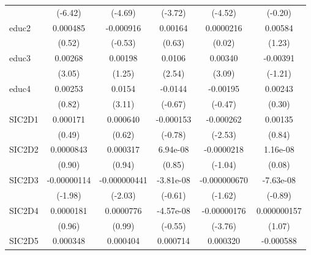 \begin{table}[htbp]
\begin{tabular}{l*{5}{c}}
            &     (-6.42)         &     (-4.69)         &     (-3.72)         &     (-4.52)         &     (-0.20)         \\
educ2       &    0.000485         &   -0.000916         &     0.00164         &   0.0000216         &     0.00584         \\
            &      (0.52)         &     (-0.53)         &      (0.63)         &      (0.02)         &      (1.23)         \\
educ3       &     0.00268\sym{**} &     0.00198         &      0.0106\sym{*}  &     0.00340\sym{**} &    -0.00391         \\
            &      (3.05)         &      (1.25)         &      (2.54)         &      (3.09)         &     (-1.21)         \\
educ4       &     0.00253         &      0.0154\sym{**} &     -0.0144         &    -0.00195         &     0.00243         \\
            &      (0.82)         &      (3.11)         &     (-0.67)         &     (-0.47)         &      (0.30)         \\
SIC2D1      &    0.000171         &    0.000640         &   -0.000153         &   -0.000262\sym{*}  &     0.00135         \\
            &      (0.49)         &      (0.62)         &     (-0.78)         &     (-2.53)         &      (0.84)         \\
SIC2D2      &   0.0000843         &    0.000317         &    6.94e-08         &  -0.0000218         &    1.16e-08         \\
            &      (0.90)         &      (0.94)         &      (0.85)         &     (-1.04)         &      (0.08)         \\
SIC2D3      & -0.00000114\sym{*}  &-0.000000441\sym{*}  &   -3.81e-08         &-0.000000670         &   -7.63e-08         \\
            &     (-1.98)         &     (-2.03)         &     (-0.61)         &     (-1.62)         &     (-0.89)         \\
SIC2D4      &   0.0000181         &   0.0000776         &   -4.57e-08         & -0.00000176\sym{***}& 0.000000157         \\
            &      (0.96)         &      (0.99)         &     (-0.55)         &     (-3.76)         &      (1.07)         \\
SIC2D5      &    0.000348         &    0.000404         &    0.000714         &    0.000320         &   -0.000588         \\

\end{tabular}
\end{table}
